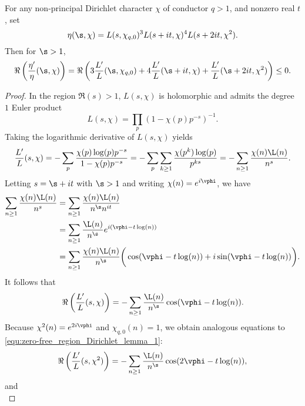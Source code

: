       \begin{lemma}\label{lem:zero-free_region_Dirichlet_lemma}
        For any non-principal Dirichlet character $\chi$ of conductor $q > 1$, and nonzero real $t$, set
        \[
          \eta(\s,\chi) = L(s,\chi_{q,0})^{3}L(s+it,\chi)^{4}L(s+2it,\chi^{2}).
        \]
        Then for $\s > 1$,
        \[
          \Re\left(\frac{\eta'}{\eta}(\s,\chi)\right) = \Re\left(3\frac{L'}{L}(\s,\chi_{q,0})+4\frac{L'}{L}(\s+it,\chi)+\frac{L'}{L}(\s+2it,\chi^{2})\right) \le 0.
        \]
      \end{lemma}
      \begin{proof}
        In the region $\Re(s) > 1$, $L(s,\chi)$ is holomorphic and admits the degree $1$ Euler product
        \[
          L(s,\chi) = \prod_{p}(1-\chi(p)p^{-s})^{-1}.
        \]
        Taking the logarithmic derivative of $L(s,\chi)$ yields
        \begin{equation}\label{equ:Drichlet_series_log_derivative_Dirichlet}
          \frac{L'}{L}(s,\chi) = -\sum_{p}\frac{\chi(p)\log(p)p^{-s}}{1-\chi(p)p^{-s}} = -\sum_{p}\sum_{k \ge 1}\frac{\chi(p^{k})\log(p)}{p^{ks}} = -\sum_{n \ge 1}\frac{\chi(n)\L(n)}{n^{s}}.
        \end{equation}
        Letting $s = \s+it$ with $\s > 1$ and writing $\chi(n) = e^{i\vphi}$, we have
        \begin{align*}
          \sum_{n \ge 1}\frac{\chi(n)\L(n)}{n^{s}} &= \sum_{n \ge 1}\frac{\chi(n)\L(n)}{n^{\s}n^{it}} \\
          &= \sum_{n \ge 1}\frac{\L(n)}{n^{\s}}e^{i(\vphi-t\log(n))} \\
          &= \sum_{n \ge 1}\frac{\chi(n)\L(n)}{n^{\s}}\bigg(\cos(\vphi-t\log(n))+i\sin(\vphi-t\log(n))\bigg).
        \end{align*}
        It follows that
        \begin{equation}\label{equ:zero-free_region_Dirichlet_lemma_1}
          \Re\left(\frac{L'}{L}(s,\chi)\right) = -\sum_{n \ge 1}\frac{\L(n)}{n^{\s}}\cos(\vphi-t\log(n)).
        \end{equation}
        Because $\chi^{2}(n) = e^{2i\vphi}$ and $\chi_{q,0}(n) = 1$, we obtain analogous equations to \cref{equ:zero-free_region_Dirichlet_lemma_1}:
        \begin{equation}\label{equ:zero-free_region_Dirichlet_lemma_2}
          \Re\left(\frac{L'}{L}(s,\chi^{2})\right) = -\sum_{n \ge 1}\frac{\L(n)}{n^{\s}}\cos(2\vphi-t\log(n)),
        \end{equation}
        and
        \begin{equation}\label{equ:zero-free_region_Dirichlet_lemma_3}

\end{equation}
\end{proof}
